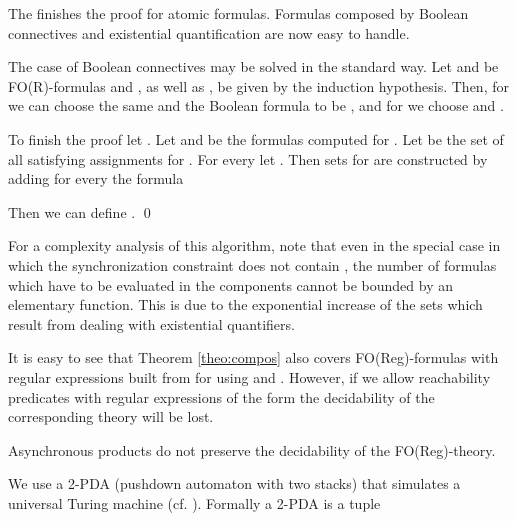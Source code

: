 \documentclass{LMCS}
\begin{document}
The finishes the proof for atomic formulas. Formulas composed by Boolean connectives and
existential quantification are now easy to handle.

The case of Boolean connectives may be solved in the standard way.
Let  and  be FO(R)-formulas and 
,  as well as , 
be given by the induction hypothesis.  Then, for  we can choose the
same  and the Boolean formula to be , and for
 we choose  and 
.

To finish the proof let . Let 
 and  be the formulas computed for . Let 
 be the set of all satisfying assignments for . For every 
 let . Then sets  for 
are constructed by adding for every  the formula 

Then we can define . 
\qed













For a complexity analysis of this algorithm, note that even in the special case in which the synchronization 
constraint does not contain , the number of formulas which have to be evaluated in the components 
cannot be bounded by an elementary function. This is due to the exponential increase of the sets  which result
from dealing with existential quantifiers. 













It is easy to see that Theorem \ref{theo:compos} also covers
FO(Reg)-formulas with regular expressions built from 
 for  using  and .
However, if we allow reachability predicates with regular expressions of the 
form  the decidability of the corresponding 
theory will be lost.












\begin{thm}
  Asynchronous products do not preserve the decidability of the 
 FO(Reg)-theory.
\end{thm}

\proof
We use a 2-PDA  (pushdown automaton 
with two stacks) that simulates 
a universal Turing machine (cf. \cite{hu79}). 
Formally a 2-PDA is a tuple 
\end{document}
